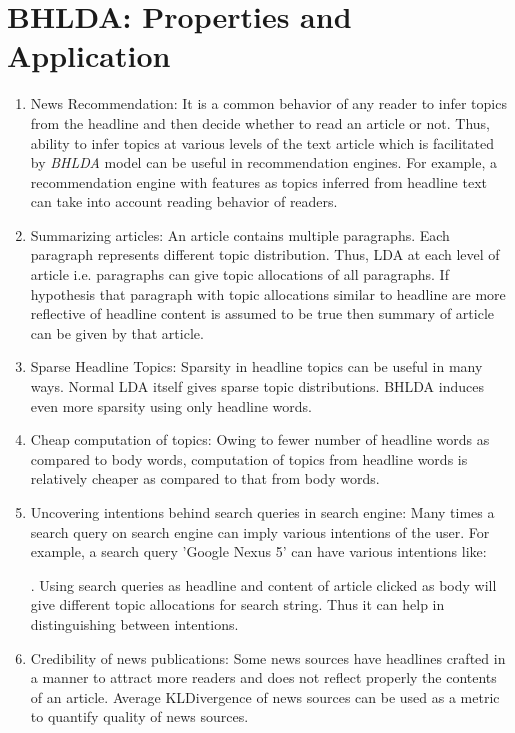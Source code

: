 \documentclass[a4paper]{article}
\begin{document}
\section{BHLDA: Properties and Application} \label{application}
\begin{enumerate}
\item News Recommendation: It is a common behavior of any reader to infer topics from the headline and then decide whether to read an article or not. Thus, ability to infer topics at various levels of the text article which is facilitated by \emph{BHLDA} model can be useful in recommendation engines. For example, a recommendation engine with features as topics inferred from headline text can take into account reading behavior of readers.  
\item Summarizing articles: An article contains multiple paragraphs. Each paragraph represents different topic distribution. Thus, LDA at each level of article i.e. paragraphs can give topic allocations of all paragraphs. If hypothesis that paragraph with topic allocations similar to headline are more reflective of headline content is assumed to be true then summary of article can be given by that article.
\item Sparse Headline Topics: Sparsity in headline topics can be useful in many ways. Normal LDA itself gives sparse topic distributions. BHLDA induces even more sparsity using only headline words. 
\item Cheap computation of topics: Owing to fewer number of headline words as compared to body words, computation of topics from headline words is relatively cheaper as compared to that from body words. 
\item Uncovering intentions behind search queries in search engine: Many times a search query on search engine can imply various intentions of the user. For example, a search query 'Google Nexus 5' can have various intentions like:
.
Using search queries as headline and content of article clicked as body will give different topic allocations for search string. Thus it can help in distinguishing between intentions. 
\item Credibility of news publications: Some news sources have headlines crafted in a manner to attract more readers and does not reflect properly the contents of an article. Average KLDivergence of news sources can be used as a metric to quantify quality of news sources. 
\end{enumerate}
\end{document}
